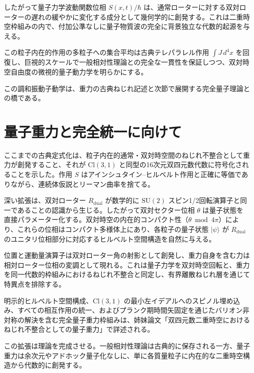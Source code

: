 \documentclass[a4paper]{article}
\begin{document}
したがって量子力学波動関数位相 $S(x,t)/\hbar$ は、通常ローターに対する双対ローターの遅れの緩やかに変化する成分として幾何学的に創発する。これは二重時空枠組みの内で、付加公準なしに量子物質波の完全に背景独立な代数的起源を与える。

この粒子内在的作用の多粒子への集合平均は古典テレパラレル作用 $\int J \, d^4x$ を回復し、巨視的スケールで一般相対性理論との完全な一貫性を保証しつつ、双対時空自由度の微視的量子動力学を明らかにする。

この調和振動子動学は、重力の古典ねじれ記述と次節で展開する完全量子理論との橋である。

\section{量子重力と完全統一に向けて}
\label{sec:quantumgravity}

ここまでの古典定式化は、粒子内在的通常・双対時空間のねじれ不整合として重力が創発すること、それが $\mathrm{Cl}(3,1)$ と同型の16次元双四元数代数に符号化されることを示した。作用 $S$ はアインシュタイン--ヒルベルト作用と正確に等価でありながら、連続体仮説とリーマン曲率を捨てる。

深い拡張は、双対ローター $R_\text{dual}$ が数学的に $\mathrm{SU}(2)$ スピン1/2回転演算子と同一であることの認識から生じる。したがって双対セクター位相 $\theta$ は量子状態を直接パラメーター化する。双対時空の内在的コンパクト性（$\theta \bmod 4\pi$）により、これらの位相はコンパクト多様体上にあり、各粒子の量子状態 $|\psi\rangle$ が $R_\text{dual}$ のユニタリ位相部分に対応するヒルベルト空間構造を自然に与える。

位置と運動量演算子は双対ローター角の射影として創発し、重力自身を含む力は相対ローター位相の変調として現れる。これは量子力学を双対時空回転と、重力を同一代数的枠組みにおけるねじれ不整合と同定し、有界離散ねじれ層を通じて特異点を排除する。

明示的ヒルベルト空間構成、$\mathrm{Cl}(3,1)$ の最小左イデアルへのスピノル埋め込み、すべての相互作用の統一、およびプランク期時間矢固定を通じたバリオン非対称の解決を含む完全量子重力枠組みは、姉妹論文「双四元数二重時空におけるねじれ不整合としての量子重力」\cite{dst-quantum-gravity}で詳述される。

この拡張は理論を完成させる。一般相対性理論は古典的に保存される一方、量子重力は余次元やアドホック量子化なしに、単に各質量粒子に内在的な二重時空構造から代数的に創発する。
\end{document}
